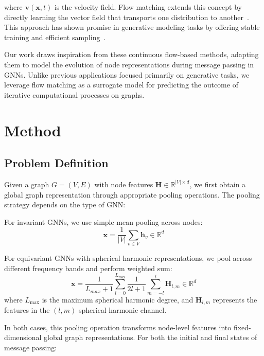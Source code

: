 \documentclass{article}
\begin{document}
where $\mathbf{v}(\mathbf{x}, t)$ is the velocity field. Flow matching extends this concept by directly learning the vector field that transports one distribution to another~\citep{lipman2022flow}. 
This approach has shown promise in generative modeling tasks by offering stable training and efficient sampling~\citep{liu2022flow, tong2023improving}.

Our work draws inspiration from these continuous flow-based methods, adapting them to model the evolution of node representations during message passing in GNNs. 
Unlike previous applications focused primarily on generative tasks, we leverage flow matching as a surrogate model for predicting the outcome of iterative computational processes on graphs.

\section{Method}

\subsection{Problem Definition}

Given a graph $G = (V, E)$ with node features $\mathbf{H} \in \mathbb{R}^{|V| \times d}$, we first obtain a global graph representation through appropriate pooling operations. 
The pooling strategy depends on the type of GNN:

For invariant GNNs, we use simple mean pooling across nodes:
\begin{equation}
\mathbf{x} = \frac{1}{|V|}\sum_{v \in V}\mathbf{h}_v \in \mathbb{R}^d
\end{equation}

For equivariant GNNs with spherical harmonic representations, we pool across different frequency bands and perform weighted sum:
\begin{equation}
\mathbf{x} = \frac{1}{L_{max}+1} \sum_{l=0}^{L_\text{max}} \frac{1}{2l+1} \sum_{m=-l}^l \mathbf{H}_{l,m} \in \mathbb{R}^d
\end{equation}
where $L_\text{max}$ is the maximum spherical harmonic degree, and $\mathbf{H}_{l,m}$ represents the features in the $(l,m)$ spherical harmonic channel.

In both cases, this pooling operation transforms node-level features into fixed-dimensional global graph representations. 
For both the initial and final states of message passing:
\end{document}
